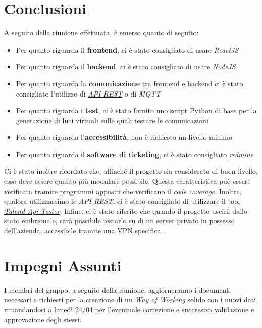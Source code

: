 \documentclass[a4paper, 12pt]{article}
\begin{document}
\section*{Conclusioni}
A seguito della riunione effettuata, è emerso quanto di seguito:
\begin{itemize}
    \item Per quanto riguarda il \textbf{frontend}, ci è stato consigliato di usare \textit{ReactJS}
    \item Per quanto riguarda il \textbf{backend}, ci è stato consigliato di usare \textit{NodeJS}
    \item Per quanto riguarda la \textbf{comunicazione} tra frontend e backend ci è stato consigliato l'utilizzo di \href{https://devacademy.it/rest-api-cosa-sono-come-funzionano-e-come-progettarle/}{\textit{API REST}} o di \textit{MQTT}
    \item Per quanto riguarda i \textbf{test}, ci è stato fornito uno script Python di base per la generazione di luci virtuali sulle quali testare le comunicazioni
    \item Per quanto riguarda l'\textbf{accessibilità}, non è richiesto un livello minimo
    \item Per quanto riguarda il \textbf{software di ticketing}, ci è stato consigliato \href{redmine.org}{\textit{redmine}}
\end{itemize}
Ci è stato inoltre ricordato che, affinché il progetto sia considerato di buon livello, esso deve essere quanto più modulare possibile. Questa caratteristica può essere verificata tramite \href{https://docs.sonarqube.org/latest/}{programmi appositi} che verificano il \textit{code coverage}. Inoltre, qualora utilizzassimo le \textit{API REST}, ci è stato consigliato di utilizzare il tool \href{https://chrome.google.com/webstore/detail/talend-api-tester-free-ed/aejoelaoggembcahagimdiliamlcdmfm?authuser=2}{\textit{Talend Api Tester}}.\newline
Infine, ci è stato riferito che quando il progetto uscirà dallo stato embrionale, sarà possibile testarlo su di un server privato in possesso dell'azienda, accessibile tramite una VPN specifica.

\section*{Impegni Assunti}
I membri del gruppo, a seguito della riunione, aggiorneranno i documenti necessari e richiesti per la creazione di un \textit{Way of Working} solido con i nuovi dati, rimandandosi a lunedì 24/04 per l'eventuale correzione e successiva validazione e approvazione degli stessi.
\end{document}

